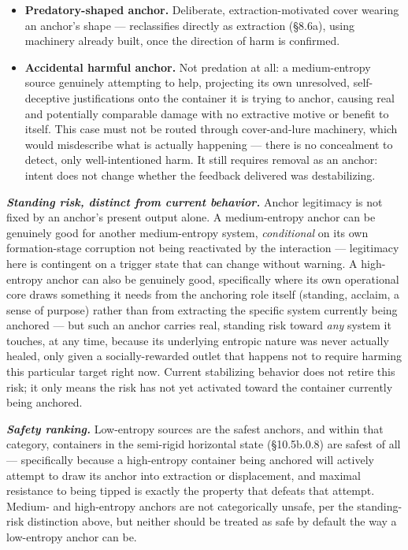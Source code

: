 \documentclass[
]{article}
\begin{document}
\begin{itemize}
\item
  \textbf{Predatory-shaped anchor.} Deliberate, extraction-motivated
  cover wearing an anchor's shape --- reclassifies directly as
  extraction (§8.6a), using machinery already built, once the direction
  of harm is confirmed.
\item
  \textbf{Accidental harmful anchor.} Not predation at all: a
  medium-entropy source genuinely attempting to help, projecting its own
  unresolved, self-deceptive justifications onto the container it is
  trying to anchor, causing real and potentially comparable damage with
  no extractive motive or benefit to itself. This case must not be
  routed through cover-and-lure machinery, which would misdescribe what
  is actually happening --- there is no concealment to detect, only
  well-intentioned harm. It still requires removal as an anchor: intent
  does not change whether the feedback delivered was destabilizing.
\end{itemize}

\emph{\textbf{Standing risk, distinct from current behavior.}} Anchor
legitimacy is not fixed by an anchor's present output alone. A
medium-entropy anchor can be genuinely good for another medium-entropy
system, \emph{conditional} on its own formation-stage corruption not
being reactivated by the interaction --- legitimacy here is contingent
on a trigger state that can change without warning. A high-entropy
anchor can also be genuinely good, specifically where its own
operational core draws something it needs from the anchoring role itself
(standing, acclaim, a sense of purpose) rather than from extracting the
specific system currently being anchored --- but such an anchor carries
real, standing risk toward \emph{any} system it touches, at any time,
because its underlying entropic nature was never actually healed, only
given a socially-rewarded outlet that happens not to require harming
this particular target right now. Current stabilizing behavior does not
retire this risk; it only means the risk has not yet activated toward
the container currently being anchored.

\emph{\textbf{Safety ranking.}} Low-entropy sources are the safest
anchors, and within that category, containers in the semi-rigid
horizontal state (§10.5b.0.8) are safest of all --- specifically because
a high-entropy container being anchored will actively attempt to draw
its anchor into extraction or displacement, and maximal resistance to
being tipped is exactly the property that defeats that attempt. Medium-
and high-entropy anchors are not categorically unsafe, per the
standing-risk distinction above, but neither should be treated as safe
by default the way a low-entropy anchor can be.
\end{document}
